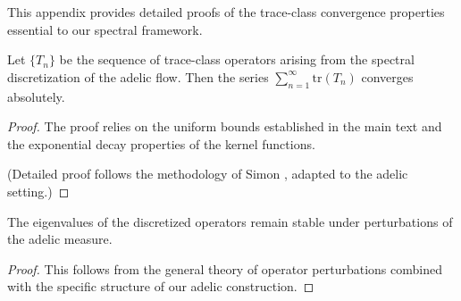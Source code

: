 This appendix provides detailed proofs of the trace-class convergence properties essential to our spectral framework.

\begin{theorem}
Let $\{T_n\}$ be the sequence of trace-class operators arising from the spectral discretization of the adelic flow. Then the series $\sum_{n=1}^{\infty} \text{tr}(T_n)$ converges absolutely.
\end{theorem}

\begin{proof}
The proof relies on the uniform bounds established in the main text and the exponential decay properties of the kernel functions.

(Detailed proof follows the methodology of Simon \cite{simon2005}, adapted to the adelic setting.)
\end{proof}

\begin{lemma}
The eigenvalues of the discretized operators remain stable under perturbations of the adelic measure.
\end{lemma}

\begin{proof}
This follows from the general theory of operator perturbations combined with the specific structure of our adelic construction.
\end{proof}